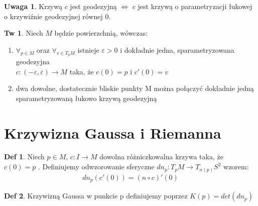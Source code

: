 \documentclass{article}
\theoremstyle{plain}
\theoremstyle{definition}
\newtheorem*{defi*}{Def}
\newtheorem*{tw*}{Tw}
\theoremstyle{definition}
\newtheorem*{not*}{Uwaga}
\begin{document}
\begin{not*}
Krzywą $c$ jest geodezyjną $\iff$ $c$ jest krzywą o parametryzacji łukowej o krzywiźnie geodezyjnej równej 0. 
\end{not*}

\begin{tw*}
Niech $M$ będzie powierzchnią, wówczas:
\begin{enumerate}
    \item $\forall_{p \in M}$ oraz $\forall_{v \in T_pM}$ istnieje $\varepsilon > 0$ i dokładnie jedna, sparametryzowana geodezyjna\\ ${c:(-\varepsilon, \varepsilon) \to M}$ taka, że $c(0) = p$ i $c'(0) = v$
    \item dwa dowolne, dostatecznie bliskie punkty M można połączyć dokładnie jedną sparametryzowaną łukowo krzywą geodezyjną
\end{enumerate}
\end{tw*}


\section{Krzywizna Gaussa i Riemanna}

\begin{defi*}
Niech $p \in M$, $c: I \to M$ dowolna różniczkowalna krzywa taka, że $c(0) = p$ . Definiujemy odwzorowanie sferyczne $ dn_p: T_pM \to T_{n(p)}S^2$ wzorem: 
\begin{align*}
    dn_p(c'(0)) = (n \circ c)'(0)
\end{align*}

\end{defi*}

\begin{defi*}
Krzywizną Gaussa w punkcie p definiujemy poprzez $K(p) = det(dn_p)$
\end{defi*}
\end{document}
